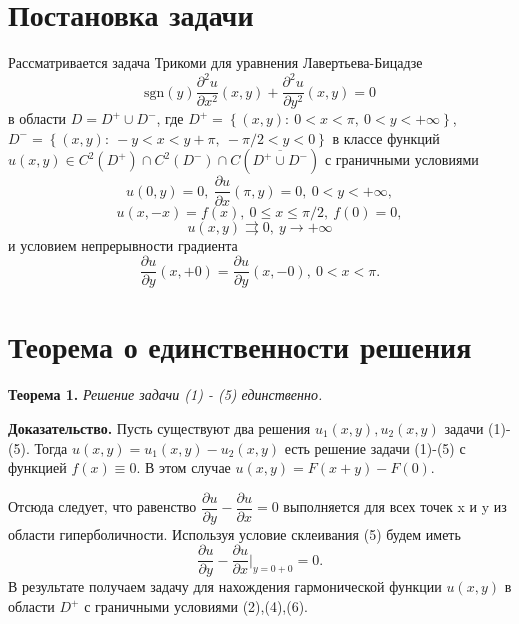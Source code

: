 \documentclass[12pt, a4paper]{article}
\begin{document}
\section{Постановка задачи}
	Рассматривается задача Трикоми для уравнения Лавертьева-Бицадзе
\begin{equation}
	\mathrm{sgn} (y) \dfrac{\partial^2 u}{\partial x^2}(x,y) + \dfrac{\partial^2 u}{\partial y^2}(x,y) = 0
\end{equation}
в области $D = D^{+} \cup D^{-}$, где $D^{+} = \left\{(x,y): \ 0 < x < \pi, \ 0 < y < + \infty \right\}$, \newline
$D^{-} = \left\{(x,y): \ -y < x < y + \pi, \ -\pi/2 < y < 0\right\}$ в классе функций $u(x,y) \in C^2(D^{+}) \cap C^2(D^{-}) \cap C(\overline{D^{+} \cup D^{-}})$ с граничными условиями
\begin{equation}
	u(0,y) = 0, \ \dfrac{\partial u}{\partial x}(\pi, y) = 0, \ 0 < y < + \infty,
\end{equation}
\begin{equation}
	u(x,-x) = f(x) , \ 0 \leq x \leq \pi/2, \ f(0) = 0, 
\end{equation}
\begin{equation}
	u(x,y) \rightrightarrows 0, \ y \to +\infty
\end{equation}
и условием непрерывности градиента
\begin{equation}
 \dfrac{\partial u}{\partial y}(x, +0) = \dfrac{\partial u}{\partial y} (x, -0), \ 0 < x < \pi.
\end{equation}
\section{Теорема о единственности решения}
\textbf{Теорема 1.} \textit{Решение задачи (1) - (5) единственно.}

\textbf{Доказательство.} 
Пусть существуют два решения $u_1(x,y), u_2(x,y)$ задачи (1)-(5). Тогда $u(x,y) = u_1(x,y) - u_2(x,y)$ есть решение задачи (1)-(5) с функцией $f(x) \equiv 0$. В этом случае $u(x,y) = F(x+y) - F(0)$.

Отсюда следует, что равенство $\dfrac{\partial u}{\partial y} - \dfrac{\partial u}{\partial x} = 0$ выполняется для всех точек x и y из области гиперболичности. Используя условие склеивания  (5) будем иметь
\begin{equation}
	\dfrac{\partial u}{\partial y} - \dfrac{\partial u}{\partial x}\vert_{y=0+0} = 0.
\end{equation}
В результате получаем задачу для нахождения гармонической функции $u(x,y)$ в области $D^{+}$ с граничными условиями (2),(4),(6).
\end{document}
